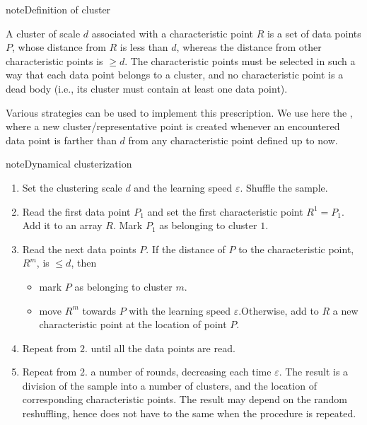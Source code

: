 \documentclass[letterpaper,10pt,english]{jupyterBook}
\begin{document}
\begin{sphinxadmonition}{note}{Definition of cluster}

\sphinxAtStartPar
A cluster of scale \(d\) associated with a characteristic point \(R\) is a set of data points \(P\), whose distance from \(R\) is less than \(d\), whereas the distance from other characteristic points is \(\ge d\). The characteristic points must be selected in such a way that each data point belongs to a cluster, and no characteristic point is a dead body (i.e., its cluster must contain at least one data point).
\end{sphinxadmonition}

\sphinxAtStartPar
Various strategies can be used to implement this prescription. We use here the , where a new cluster/representative point is created whenever an encountered data point is farther than \(d\) from any characteristic point defined up to now.

\begin{sphinxadmonition}{note}{Dynamical clusterization}
\begin{enumerate}
%
\item {} 
\sphinxAtStartPar
Set the clustering scale \(d\) and the learning speed \(\varepsilon\). Shuffle the sample.

\item {} 
\sphinxAtStartPar
Read the first data point \(P_1\) and set the first characteristic point \(R^1=P_1\). Add it to an array \(R\). Mark \(P_1\) as belonging to cluster \(1\).

\item {} 
\sphinxAtStartPar
Read the next data points \(P\). If the distance of \(P\) to the  characteristic point, \(R^m\), is \(\le d\), then
\begin{itemize}
\item {} 
\sphinxAtStartPar
mark \(P\) as belonging to cluster \(m\).

\item {} 
\sphinxAtStartPar
move \(R^m\) towards \(P\) with the learning speed \(\varepsilon\).Otherwise, add to \(R\) a new characteristic point at the location of point \(P\).

\end{itemize}

\item {} 
\sphinxAtStartPar
Repeat from \(2.\) until all the data points are read.

\item {} 
\sphinxAtStartPar
Repeat from \(2.\) a number of rounds, decreasing each time \(\varepsilon\). The result is a division of the sample into a number of clusters, and the location of corresponding characteristic points. The result may depend on the random reshuffling, hence does not have to the same when the procedure is repeated.

\end{enumerate}
\end{sphinxadmonition}
\end{document}
